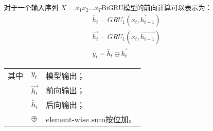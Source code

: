 对于一个输入序列 $X = x_1 x_2 \dots x_T$BiGRU模型的前向计算可以表示为：
\begin{gather}
  \overleftarrow{h_t} = GRU_1(x_t,\overleftarrow{h_{t-1}}) \label{eq:bigru_htleft} \\
  \overrightarrow{h_t} = GRU_1(x_t,\overrightarrow{h_{t-1}}) \label{eq:bigru_htright} \\
  y_t = \overleftarrow{h_t} \oplus \overrightarrow{h_t} \label{eq:bigru_out}
\end{gather}
\begin{flushleft}
  \renewcommand\arraystretch{1.25}
  \begin{tabularx}{\textwidth}{@{}>{\normalsize\rm}l@{\quad}>{\normalsize\rm}l@{——}>{\normalsize\rm}X@{}}
  其中
  &  $y_t$ &模型输出；\\
  &  $\overrightarrow{h_t}$ &前向输出；\\
  &  $\overleftarrow{h_t} $ &后向输出；\\
  &  $\oplus$ & element-wise sum按位加。\\
  \end{tabularx}\vspace{.5ex}%
\end{flushleft}

